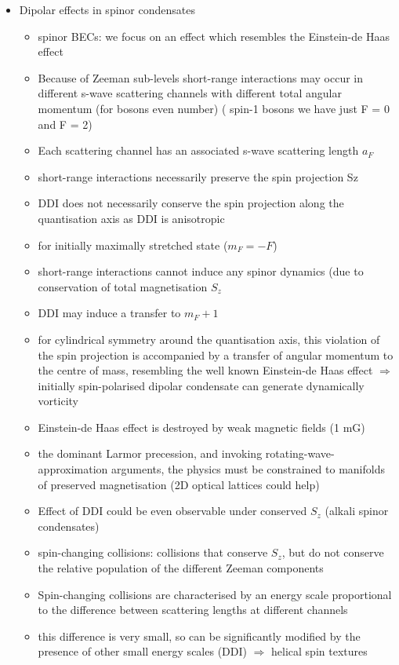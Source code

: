 \begin{itemize}
        \item Dipolar effects in spinor condensates
        \begin{itemize}
            \item spinor BECs: we focus on an effect which resembles the Einstein-de Haas effect
            \item Because of Zeeman sub-levels short-range interactions may occur in different s-wave scattering channels with different total angular momentum (for bosons even number) ( spin-1 bosons we have just F = 0 and F = 2)
            \item Each scattering channel has an associated s-wave scattering length $a_{F}$
            \item short-range interactions necessarily preserve the spin projection Sz
            \item DDI does not necessarily conserve the spin projection along the quantisation axis as DDI is anisotropic
            \item for initially maximally stretched state ($m_{F} =  - F$)
            \item short-range interactions cannot induce any spinor dynamics (due to conservation of total magnetisation $S_{z}$
            \item DDI may induce a transfer to $m_{F} + 1$
            \item for cylindrical symmetry around the quantisation axis, this violation of the spin projection is accompanied by a transfer of angular momentum to the centre of mass, resembling the well known Einstein-de Haas effect $\Rightarrow$ initially spin-polarised dipolar condensate can generate dynamically vorticity
            \item Einstein-de Haas effect is destroyed by weak magnetic fields (1 mG)
            \item the dominant Larmor precession, and invoking rotating-wave-approximation arguments, the physics must be constrained to manifolds of preserved magnetisation (2D optical lattices could help)
            \item Effect of DDI could be even observable under conserved $S_{z}$ (alkali spinor condensates)
            \item spin-changing collisions: collisions that conserve $S_{z}$, but do not conserve the relative population of the different Zeeman components
            \item Spin-changing collisions are characterised by an energy scale proportional
to the difference between scattering lengths at different channels
            \item this difference is very small, so can be significantly modified by the presence of other small energy scales (DDI) $\Rightarrow$ helical spin textures
        \end{itemize}
\end{itemize}

